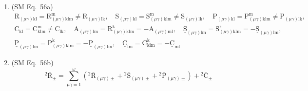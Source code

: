 \documentclass[12pt]{article}
\begin{document}
\begin{enumerate}[label=(\arabic*), series=formellist]
    \item (SM Eq.\ 56a) 
    \[
    \begin{gathered}
    \mathrm{R}_{(\mu\gamma)\mathrm{kl}} = \mathrm{R}^\mathrm{m}_{(\mu\gamma)\mathrm{klm}} \ne \mathrm{R}_{(\mu\gamma)\mathrm{lk}}, \quad \mathrm{S}_{(\mu\gamma)\mathrm{kl}} = \mathrm{S}^\mathrm{m}_{(\mu\gamma)\mathrm{klm}} \ne \mathrm{S}_{(\mu\gamma)\mathrm{lk}}, \quad \mathrm{P}_{(\mu\gamma)\mathrm{kl}} = \mathrm{P}^\mathrm{m}_{(\mu\gamma)\mathrm{klm}} \ne \mathrm{P}_{(\mu\gamma)\mathrm{lk}}, \\
    \mathrm{C}_{\mathrm{kl}} = \mathrm{C}^\mathrm{m}_{\mathrm{klm}} \ne \mathrm{C}_{\mathrm{lk}}, \quad \mathrm{A}_{(\mu\gamma)\mathrm{lm}} = \mathrm{R}^\mathrm{k}_{(\mu\gamma)\mathrm{klm}} = -\mathrm{A}_{(\mu\gamma)\mathrm{ml}}, \quad \underline{\mathrm{S}}_{(\mu\gamma)\mathrm{lm}} = \mathrm{S}^\mathrm{k}_{(\mu\gamma)\mathrm{klm}} = -\underline{\mathrm{S}}_{(\mu\gamma)\mathrm{lm}}, \\
    \underline{\mathrm{P}}_{(\mu\gamma)\mathrm{lm}} = \mathrm{P}^\mathrm{k}_{(\mu\gamma)\mathrm{klm}} = -\underline{\mathrm{P}}_{(\mu\gamma)\mathrm{lm}}, \quad \underline{\mathrm{C}}_{\mathrm{lm}} = \mathrm{C}^\mathrm{k}_{\mathrm{klm}} = -\underline{\mathrm{C}}_{\mathrm{ml}}
    \end{gathered}
    \]

    \item (SM Eq.\ 56b) 
    \[
    {}^2\bar{\mathrm{R}}_\pm = \sum_{\mu\gamma=1}^{\omega} \left( {}^2\bar{\mathrm{R}}_{(\mu\gamma)\pm} + {}^2\bar{\mathrm{S}}_{(\mu\gamma)\pm} + {}^2\bar{\mathrm{P}}_{(\mu\gamma)\pm} \right) + {}^2\bar{\mathrm{C}}_\pm
    \]


\end{enumerate}
\end{document}
